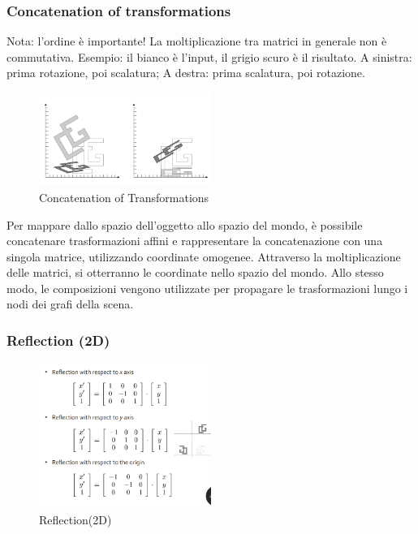 \subsubsection{Concatenation of transformations} 
Nota: l'ordine è importante! La moltiplicazione tra matrici in generale non è commutativa. Esempio: il bianco è l'input, il grigio scuro è il risultato. A sinistra: prima rotazione, poi scalatura; A destra: prima scalatura, poi rotazione.
\begin{figure}[H]
    \centering
    \includegraphics[width=0.5\textwidth]{images/ConcTransf.png} 
    \caption{Concatenation of Transformations}
    \label{fig:immagine}
\end{figure}
Per mappare dallo spazio dell'oggetto allo spazio del mondo, è possibile concatenare trasformazioni affini e rappresentare la concatenazione con una singola matrice, utilizzando coordinate omogenee. Attraverso la moltiplicazione delle matrici, si otterranno le coordinate nello spazio del mondo. Allo stesso modo, le composizioni vengono utilizzate per propagare le trasformazioni lungo i nodi dei grafi della scena.
\subsubsection{Reflection (2D)}
\begin{figure}[H]
    \centering
    \includegraphics[width=0.5\textwidth]{images/Reflection.png} 
    \caption{Reflection(2D)}
    \label{fig:immagine}
\end{figure}
